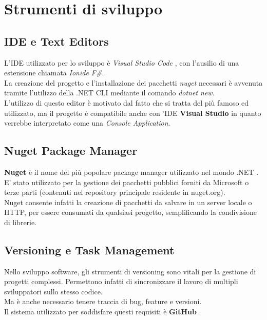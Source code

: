 \documentclass[\main/tesi.tex]{subfiles}
\begin{document}
\section{Strumenti di sviluppo}

\subsection{IDE e Text Editors}
L'IDE utilizzato per lo sviluppo è \textit{Visual Studio Code} \cite{vscode}, con l'ausilio di una estensione chiamata \textit{Ionide F\#}. \\
La creazione del progetto e l'installazione dei pacchetti \textit{nuget} \cite{nuget} necessari è avvenuta tramite l'utilizzo della .NET CLI mediante il comando \textit{dotnet new}. \\
L'utilizzo di questo editor è motivato dal fatto che si tratta del più famoso ed utilizzato, ma il progetto è compatibile anche con 'IDE \textbf{Visual Studio} \cite{visualstudio} in quanto verrebbe interpretato come una \textit{Console Application}. \\

\subsection{Nuget Package Manager}
\textbf{Nuget} \cite{nuget} è il nome del più popolare package manager utilizzato nel mondo .NET \cite{dotnet}.\\
E' stato utilizzato per la gestione dei pacchetti pubblici forniti da Microsoft o terze parti (contenuti nel repository principale residente in nuget.org).\\
Nuget consente infatti la creazione di pacchetti da salvare in un server locale o HTTP, per essere consumati da qualsiasi progetto, semplificando la condivisione di librerie.\\

\subsection{Versioning e Task Management}
Nello sviluppo software, gli strumenti di versioning sono vitali per la gestione di progetti complessi.
Permettono infatti di sincronizzare il lavoro di multipli sviluppatori sullo stesso codice.\\
Ma è anche necessario tenere traccia di bug, feature e versioni.\\
Il sistema utilizzato per soddisfare questi requisiti è \textbf{GitHub} \cite{github}.\\
\end{document}
